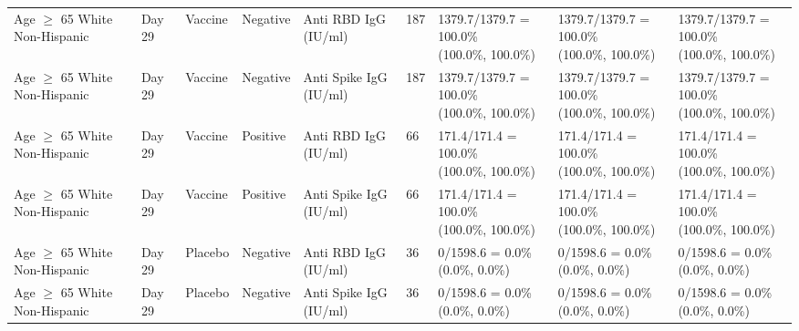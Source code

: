 \documentclass[]{book}
\theoremstyle{definition}
\theoremstyle{definition}
\theoremstyle{definition}
\newcommand{\1}{\mathbbm{1}}
\begin{document}
\begin{landscape}
\begin{ThreePartTable}
\begin{longtable}[t]{>{\raggedright\arraybackslash}p{2.7cm}llllllll}
\hspace{1em}Age $\geq$ 65 White Non-Hispanic & Day 29 & Vaccine & Negative & Anti RBD IgG (IU/ml) & 187 & \makecell[l]{1379.7/1379.7 = 100.0\%\\(100.0\%, 100.0\%)} & \makecell[l]{1379.7/1379.7 = 100.0\%\\(100.0\%, 100.0\%)} & \makecell[l]{1379.7/1379.7 = 100.0\%\\(100.0\%, 100.0\%)}\\
\hspace{1em}Age $\geq$ 65 White Non-Hispanic & Day 29 & Vaccine & Negative & Anti Spike IgG (IU/ml) & 187 & \makecell[l]{1379.7/1379.7 = 100.0\%\\(100.0\%, 100.0\%)} & \makecell[l]{1379.7/1379.7 = 100.0\%\\(100.0\%, 100.0\%)} & \makecell[l]{1379.7/1379.7 = 100.0\%\\(100.0\%, 100.0\%)}\\
\hspace{1em}Age $\geq$ 65 White Non-Hispanic & Day 29 & Vaccine & Positive & Anti RBD IgG (IU/ml) & 66 & \makecell[l]{171.4/171.4 = 100.0\%\\(100.0\%, 100.0\%)} & \makecell[l]{171.4/171.4 = 100.0\%\\(100.0\%, 100.0\%)} & \makecell[l]{171.4/171.4 = 100.0\%\\(100.0\%, 100.0\%)}\\
\hspace{1em}Age $\geq$ 65 White Non-Hispanic & Day 29 & Vaccine & Positive & Anti Spike IgG (IU/ml) & 66 & \makecell[l]{171.4/171.4 = 100.0\%\\(100.0\%, 100.0\%)} & \makecell[l]{171.4/171.4 = 100.0\%\\(100.0\%, 100.0\%)} & \makecell[l]{171.4/171.4 = 100.0\%\\(100.0\%, 100.0\%)}\\
\hspace{1em}Age $\geq$ 65 White Non-Hispanic & Day 29 & Placebo & Negative & Anti RBD IgG (IU/ml) & 36 & \makecell[l]{0/1598.6 = 0.0\%\\(0.0\%, 0.0\%)} & \makecell[l]{0/1598.6 = 0.0\%\\(0.0\%, 0.0\%)} & \makecell[l]{0/1598.6 = 0.0\%\\(0.0\%, 0.0\%)}\\
\hspace{1em}Age $\geq$ 65 White Non-Hispanic & Day 29 & Placebo & Negative & Anti Spike IgG (IU/ml) & 36 & \makecell[l]{0/1598.6 = 0.0\%\\(0.0\%, 0.0\%)} & \makecell[l]{0/1598.6 = 0.0\%\\(0.0\%, 0.0\%)} & \makecell[l]{0/1598.6 = 0.0\%\\(0.0\%, 0.0\%)}\\

\end{longtable}
\end{ThreePartTable}
\end{landscape}
\end{document}
